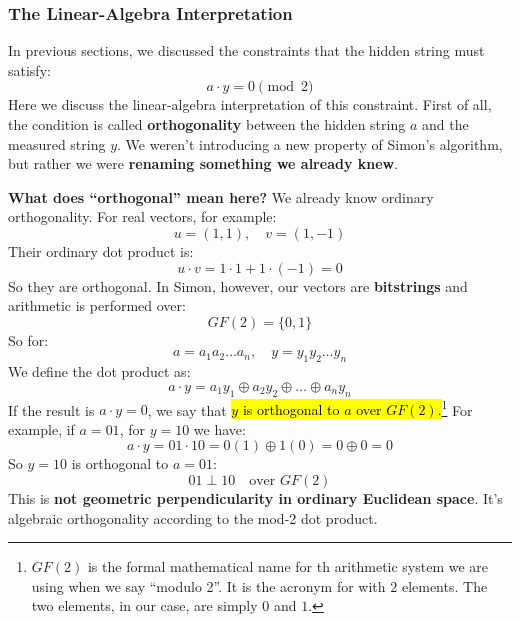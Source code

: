 \subsubsection{The Linear-Algebra Interpretation}\label{sec:linear-algebra-interpretation-simons-algorithm}

In previous sections, we discussed the constraints that the hidden string must satisfy:
\begin{equation*}
    a \cdot y = 0 \pmod 2
\end{equation*}
Here we discuss the linear-algebra interpretation of this constraint. First of all, the condition is called \textbf{orthogonality} between the hidden string $a$ and the measured string $y$. We weren't introducing a new property of Simon's algorithm, but rather we were \textbf{renaming something we already knew}.

\highspace
\textcolor{Green3}{ \textbf{What does ``orthogonal'' mean here?}} We already know ordinary orthogonality. For real vectors, for example:
\begin{equation*}
    u = (1, 1), \quad v = (1, -1)
\end{equation*}
Their ordinary dot product is:
\begin{equation*}
    u \cdot v = 1 \cdot 1 + 1 \cdot (-1) = 0
\end{equation*}
So they are orthogonal. In Simon, however, our vectors are \textbf{bitstrings} and arithmetic is performed over:
\begin{equation*}
    GF(2) = \{0, 1\}
\end{equation*}
So for:
\begin{equation*}
    a = a_1 a_2 \ldots a_n, \quad y = y_1 y_2 \ldots y_n
\end{equation*}
We define the dot product as:
\begin{equation*}
    a \cdot y = a_1 y_1 \oplus a_2 y_2 \oplus \ldots \oplus a_n y_n
\end{equation*}
If the result is $a \cdot y = 0$, we say that \hl{$y$ is orthogonal to $a$ over $GF(2)$.}\footnote{%
    $GF(2)$ is the formal mathematical name for th arithmetic system we are using when we say ``modulo 2''. It is the acronym for  with $2$ elements. The two elements, in our case, are simply $0$ and $1$.
} For example, if $a = 01$, for $y = 10$ we have:
\begin{equation*}
    a \cdot y = 01 \cdot 10 = 0(1) \oplus 1(0) = 0 \oplus 0 = 0
\end{equation*}
So $y = 10$ is orthogonal to $a = 01$:
\begin{equation*}
    01 \perp 10 \quad \text{over } GF(2)
\end{equation*}
This is \textbf{not geometric perpendicularity in ordinary Euclidean space}. It's algebraic orthogonality according to the mod-2 dot product.

